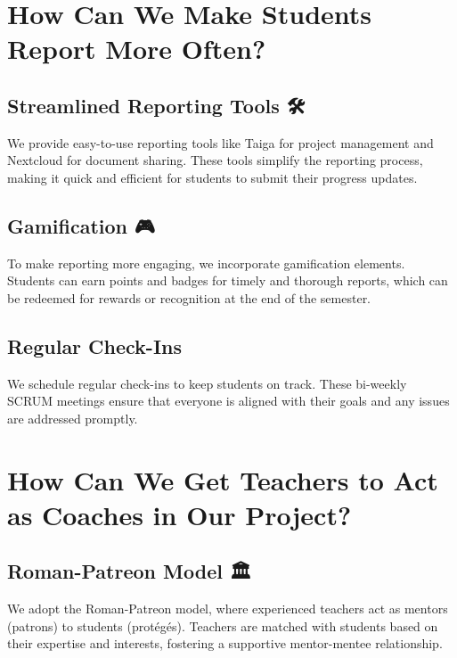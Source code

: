 \documentclass[
  letterpaper,
  DIV=11,
  numbers=noendperiod]{scrreprt}
\begin{document}
\section{How Can We Make Students Report More Often?
📝}\label{how-can-we-make-students-report-more-often}

\subsection{Streamlined Reporting Tools
🛠️}\label{streamlined-reporting-tools}

We provide easy-to-use reporting tools like Taiga for project management
and Nextcloud for document sharing. These tools simplify the reporting
process, making it quick and efficient for students to submit their
progress updates.

\subsection{Gamification 🎮}\label{gamification}

To make reporting more engaging, we incorporate gamification elements.
Students can earn points and badges for timely and thorough reports,
which can be redeemed for rewards or recognition at the end of the
semester.

\subsection{Regular Check-Ins 🔄}\label{regular-check-ins}

We schedule regular check-ins to keep students on track. These bi-weekly
SCRUM meetings ensure that everyone is aligned with their goals and any
issues are addressed promptly.

\section{How Can We Get Teachers to Act as Coaches in Our Project?
👨‍🏫👩‍🏫}\label{how-can-we-get-teachers-to-act-as-coaches-in-our-project}

\subsection{Roman-Patreon Model 🏛️}\label{roman-patreon-model}

We adopt the Roman-Patreon model, where experienced teachers act as
mentors (patrons) to students (protégés). Teachers are matched with
students based on their expertise and interests, fostering a supportive
mentor-mentee relationship.
\end{document}
